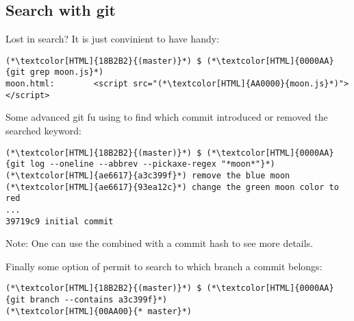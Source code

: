 \subsection{Search with git}
\begin{frame}[fragile]
  \subslidetitle
  Lost in search? It is just convinient to have  handy:
  \begin{lstlisting}
(*\textcolor[HTML]{18B2B2}{(master)}*) $ (*\textcolor[HTML]{0000AA}{git grep moon.js}*)
moon.html:        <script src="(*\textcolor[HTML]{AA0000}{moon.js}*)"></script>
\end{lstlisting}

  Some advanced git fu using  to find which commit introduced or removed the searched keyword:
  \begin{lstlisting}
(*\textcolor[HTML]{18B2B2}{(master)}*) $ (*\textcolor[HTML]{0000AA}{git log --oneline --abbrev --pickaxe-regex "*moon*"}*)
(*\textcolor[HTML]{ae6617}{a3c399f}*) remove the blue moon
(*\textcolor[HTML]{ae6617}{93ea12c}*) change the green moon color to red
...
39719c9 initial commit
\end{lstlisting}

Note: One can use the  combined with a commit hash to see more details.

  Finally some option of  permit to search to which branch a commit belongs:
  \begin{lstlisting}
(*\textcolor[HTML]{18B2B2}{(master)}*) $ (*\textcolor[HTML]{0000AA}{git branch --contains a3c399f}*)
(*\textcolor[HTML]{00AA00}{* master}*)
\end{lstlisting}
\end{frame}

